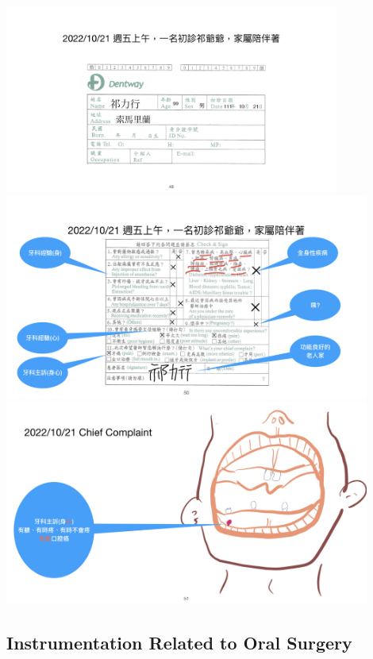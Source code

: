 \documentclass[
paper=landscape,
paper=160mm:90mm, %
fontsize=11pt, %
pagesize, %
parskip=half-, %
]{scrartcl} %
\theoremstyle{mythmstyle} %
\begin{document}
\begin{center} %
    \centering
    \includegraphics[width=11cm]{ContemporaryOMS_case祁爺爺.jpeg.001.jpeg}
    \includegraphics[width=12cm]{ContemporaryOMS_case祁爺爺.jpeg.002.jpeg}
    \includegraphics[width=12cm]{ContemporaryOMS_case祁爺爺.jpeg.003.jpeg}
\end{center}



\subsection{Instrumentation Related to Oral Surgery}
\end{document}

